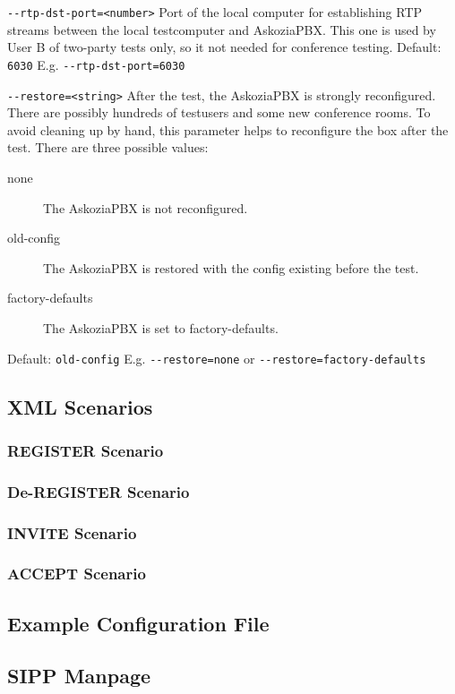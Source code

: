 \begin {description}
\item {\texttt{-{}-rtp-dst-port=<number>}} \newline
Port of the local computer for establishing RTP streams between the local testcomputer
and AskoziaPBX. This one is used by User B of two-party tests only, so it not needed
for conference testing.
\newline Default: \texttt{6030}
\newline E.g. \texttt{-{}-rtp-dst-port=6030}

\item {\texttt{-{}-restore=<string>}} \newline
After the test, the AskoziaPBX is strongly reconfigured. There are possibly hundreds
of testusers and some new conference rooms. To avoid cleaning up by hand, this parameter
helps to reconfigure the box after the test. There are three possible values:
	\begin{description}
	\item [none] The AskoziaPBX is not reconfigured.
	\item [old-config] The AskoziaPBX is restored with the config existing before the test.
	\item [factory-defaults] The AskoziaPBX is set to factory-defaults.
	\end{description}
Default: \texttt{old-config}
\newline E.g. \texttt{-{}-restore=none} or \texttt{-{}-restore=factory-defaults}
\end{description}

\subsection{XML Scenarios}
\subsubsection{REGISTER Scenario}
\subsubsection{De-REGISTER Scenario}
\subsubsection{INVITE Scenario}
\subsubsection{ACCEPT Scenario}

\subsection{Example Configuration File}

\subsection{SIPP Manpage}

